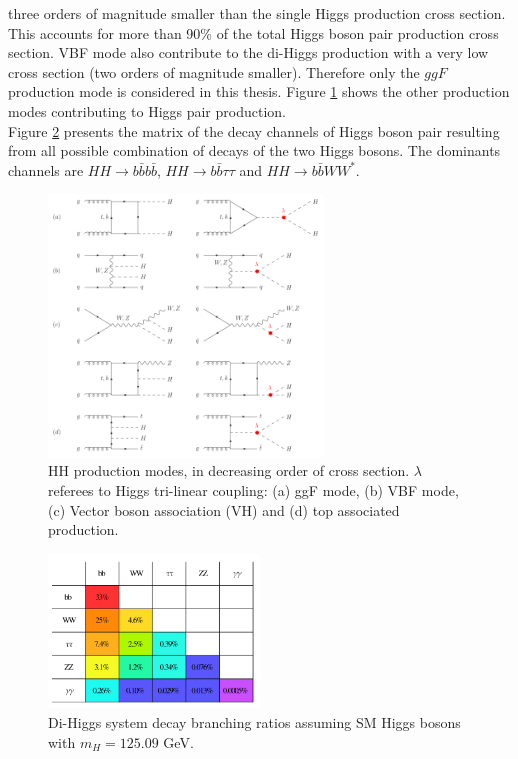 three orders of magnitude smaller than the single Higgs production cross section. This accounts for more than 90\% of the total Higgs boson pair production cross section. VBF mode also contribute to the di-Higgs production with a very low cross section (two orders of magnitude smaller). Therefore only the $ggF$ production mode is considered in this thesis. Figure \ref{fig:chap1:HH:HPD:FYS} shows the other production modes contributing to Higgs pair production. \\
Figure \ref{fig:chap1:HH:HPD:DCY} presents the matrix of the decay channels of Higgs boson pair resulting from all possible combination of decays of the two Higgs bosons. The dominants channels are $HH\rightarrow b\bar{b}b\bar{b}$, $HH\rightarrow b\bar{b}\tau\tau$ and $HH\rightarrow b\bar{b}WW^*$. 
\begin{figure}[H]
    \centering
    \includegraphics[width=0.65\textwidth]{Ch1/Img/HH_feyns.png}
    \caption{HH production modes, in decreasing order of cross section. $\lambda$ referees to Higgs tri-linear coupling: (a) ggF mode, (b) VBF mode, (c) Vector boson association (VH) and (d) top associated production.}
    \label{fig:chap1:HH:HPD:FYS}
\end{figure}
\begin{figure}[H]
    \centering
    \includegraphics[width=0.5\textwidth]{Ch1/Img/HH_decays.png}
    \caption{Di-Higgs system decay branching ratios assuming SM Higgs bosons with $m_H=125.09$ GeV.}
    \label{fig:chap1:HH:HPD:DCY}
\end{figure}
